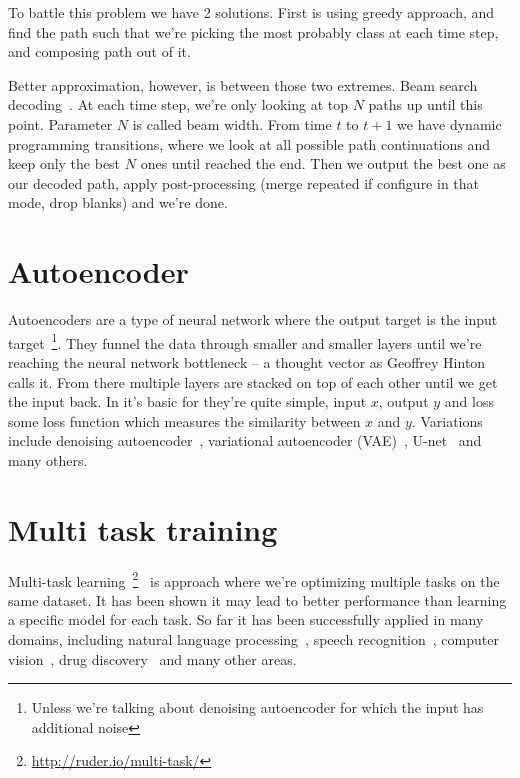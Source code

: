 \documentclass[times, utf8, diplomski, english]{fer}
\begin{document}
To battle this problem we have 2 solutions. First is using greedy approach, and find the path such that we're picking the most probably class at each time step, and composing path out of it.

Better approximation, however, is between those two extremes. Beam search decoding~\cite{graves_decode}. At each time step, we're only looking at top $N$ paths up until this point. Parameter $N$ is called beam width. From time $t$ to $t+1$ we have dynamic programming transitions, where we look at all possible path continuations and keep only the best $N$ ones until reached the end. Then we output the best one as our decoded path, apply post-processing (merge repeated if configure in that mode, drop blanks) and we're done.

\section{Autoencoder}
\label{sec:autoencoder}
Autoencoders are a type of neural network where the output target is the input target~\footnote{Unless we're talking about denoising autoencoder for which the input has additional noise}. They funnel the data through smaller and smaller layers until we're reaching the neural network bottleneck -- a thought vector as Geoffrey Hinton calls it.  From there multiple layers are stacked on top of each other until we get the input back. In it's basic for they're quite simple, input $x$, output $y$ and loss some loss function which measures the similarity between $x$ and $y$. Variations include denoising autoencoder~\citep{vincent2008extracting}, variational autoencoder (VAE)~\citep{kingma2013auto}, U-net~\citep{DBLP:journals/corr/RonnebergerFB15} and many others. 

\section{Multi task training}
Multi-task learning~\footnote{\url{http://ruder.io/multi-task/}}~\citep{multi-task-learning,Caruana1997,DBLP:journals/corr/abs-1106-0245} is approach where we're optimizing multiple tasks on the same dataset. 
It has been shown it may lead to better performance than learning a specific model for each task. 
So far it has been successfully applied in many domains, including natural language processing~\citep{Collobert:2008:UAN:1390156.1390177}, speech recognition~\citep{speech_multitask}, computer vision~\citep{cv-multitask}, drug discovery~\citep{ramsundar2015massively} and many other areas. 
\end{document}
